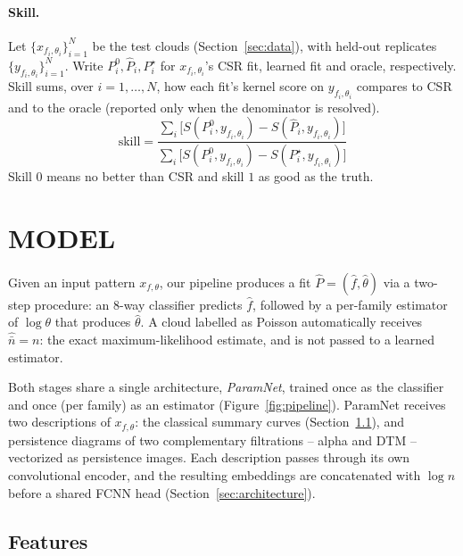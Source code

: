 \documentclass[twoside]{article}
\newcommand{\nb}{\bar n}
\begin{document}
\paragraph{Skill.}
Let $\{x_{f_i, \theta_i}\}_{i=1}^N$ be the test clouds (Section~\ref{sec:data}), with held-out replicates $\{y_{f_i, \theta_i}\}_{i=1}^N$. Write $P^0_i,\hat P_i,P^\star_i$ for $x_{f_i, \theta_i}$'s CSR fit, learned fit and oracle, respectively. Skill sums, over $i=1,\dots,N$, how each fit's kernel score on $y_{f_i, \theta_i}$ compares to CSR and to the oracle (reported only when the denominator is resolved).
\begin{equation}
  \mathrm{skill}=\frac{\sum_i\big[S(P^0_i,y_{f_i, \theta_i})-S(\hat P_i,y_{f_i, \theta_i})\big]}{\sum_i\big[S(P^0_i,y_{f_i, \theta_i})-S(P^\star_i,y_{f_i, \theta_i})\big]}
  \label{eq:skill}
\end{equation}
Skill $0$ means no better than CSR and skill $1$ as good as the truth.


\section{MODEL}
\label{sec:model}

Given an input pattern $x_{f, \theta}$, our pipeline produces a fit $\hat P = (\hat f, \hat\theta)$ via a two-step procedure: an 8-way classifier predicts $\hat f$, followed by a per-family estimator of $\log\theta$ that produces $\hat\theta$. A cloud labelled as Poisson automatically receives $\hat\nb=n$: the exact maximum-likelihood estimate, and is not passed to a learned estimator.

Both stages share a single architecture, \emph{ParamNet}, trained once as the classifier and once (per family) as an estimator (Figure~\ref{fig:pipeline}). ParamNet receives two descriptions of $x_{f, \theta}$: the classical summary curves (Section~\ref{sec:inputs}), and persistence diagrams of two complementary filtrations -- alpha and DTM -- vectorized as persistence images. Each description passes through its own convolutional encoder, and the resulting embeddings are concatenated with $\log n$ before a shared FCNN head (Section~\ref{sec:architecture}).


\subsection{Features}
\label{sec:inputs}
\end{document}
